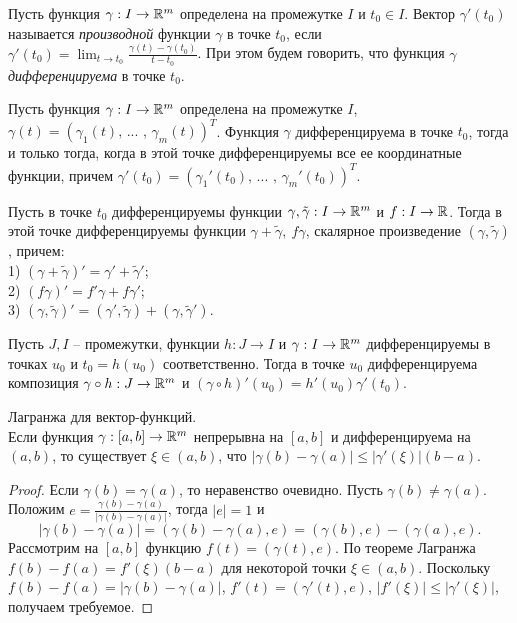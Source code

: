 \begin{definition}
    Пусть функция $\gamma: I \to \mathbb{R}^m$ определена на промежутке $I$ и $t_{0} \in I$. Вектор $\gamma'(t_{0})$ называется \textit{производной} функции $\gamma$ в точке $t_{0}$, если $\gamma'(t_{0}) = \lim_{t \to t_{0}}\frac{\gamma(t) - \gamma(t_{0})}{t - t_{0}}$. При этом будем говорить, что функция $\gamma$ \textit{дифференцируема} в точке $t_{0}$.
\end{definition}

\begin{corollary}
    Пусть функция $\gamma: I \to \mathbb{R}^m$ определена на промежутке $I$, $\gamma(t) = (\gamma_{1}(t)\text{, ... , } \gamma_{m}(t))^{T}$. Функция $\gamma$ дифференцируема в точке $t_{0}$, тогда и только тогда, когда в этой точке дифференцируемы все ее координатные функции, причем $\gamma'(t_{0}) = (\gamma_{1}'(t_{0})\text{, ... , }\gamma_{m}'(t_{0}))^{T}$.
\end{corollary}

\begin{corollary}
    Пусть в точке $t_{0}$ дифференцируемы функции $\gamma, \tilde\gamma: I \to \mathbb{R}^m$ и $f: I \to \mathbb{R}$. Тогда в этой точке дифференцируемы функции $\gamma + \tilde\gamma, \ f\gamma$, скалярное произведение $(\gamma, \tilde\gamma)$, причем:\\
    1) $(\gamma + \tilde\gamma)' = \gamma' + \tilde\gamma'$;\\
    2) $(f\gamma)' = f'\gamma + f\gamma'$;\\
    3) $(\gamma, \tilde\gamma)' = (\gamma', \tilde\gamma) + (\gamma, \tilde\gamma')$.
\end{corollary}

\begin{corollary}
    Пусть $J, I$ -- промежутки, функции $h: J \to I$ и $\gamma: I \to \mathbb{R}^m$ дифференцируемы в точках $u_{0}$ и $t_{0} = h(u_{0})$ соответственно. Тогда в точке $u_{0}$ дифференцируема композиция $\gamma\circ h: J \to \mathbb{R}^m$ и $(\gamma\circ h)'(u_{0}) = h'(u_{0})\gamma'(t_{0})$.
\end{corollary}

\begin{theorem}{Лагранжа для вектор-функций.}\\
    Если функция $\gamma: [a, b] \to \mathbb{R}^m$ непрерывна на $[a, b]$ и дифференцируема на $(a, b)$, то существует $\xi \in (a, b)$, что $|\gamma(b) - \gamma(a)| \leq |\gamma'(\xi)|(b - a)$.
\end{theorem}

\begin{proof}
    Если $\gamma(b) = \gamma(a)$, то неравенство очевидно. Пусть $\gamma(b) \neq \gamma(a)$. Положим $e = \frac{\gamma(b) - \gamma(a)}{|\gamma(b) - \gamma(a)|}$, тогда $|e| = 1$ и 
    \[|\gamma(b) - \gamma(a)| = (\gamma(b) - \gamma(a), e) = (\gamma(b), e) - (\gamma(a), e).\]
    Рассмотрим на $[a, b]$ функцию $f(t) = (\gamma(t), e)$. По теореме Лагранжа $f(b) - f(a) = f'(\xi)(b - a)$ для некоторой точки $\xi \in (a, b)$. Поскольку $f(b) - f(a) = |\gamma(b) - \gamma(a)|$, $f'(t) = (\gamma'(t), e)$, $|f'(\xi)| \leq |\gamma'(\xi)|$, получаем требуемое.
\end{proof}

